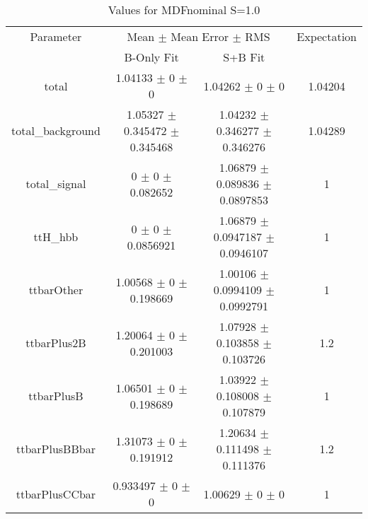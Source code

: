 \begin{table}
\centering
\caption{Values for MDFnominal S=1.0}
\begin{tabular}{cccc}
\toprule
Parameter & \multicolumn{2}{c}{Mean $\pm$ Mean Error $\pm$ RMS} & Expectation\\
 & B-Only Fit & S+B Fit & \\
\midrule
total & \num{1.04133} $\pm$ \num{0} $\pm$ \num{0} & \num{1.04262} $\pm$ \num{0} $\pm$ \num{0} & \num{1.04204}\\
total\_background & \num{1.05327} $\pm$ \num{0.345472} $\pm$ \num{0.345468} & \num{1.04232} $\pm$ \num{0.346277} $\pm$ \num{0.346276} & \num{1.04289}\\
total\_signal & \num{0} $\pm$ \num{0} $\pm$ \num{0.082652} & \num{1.06879} $\pm$ \num{0.089836} $\pm$ \num{0.0897853} & \num{1}\\
ttH\_hbb & \num{0} $\pm$ \num{0} $\pm$ \num{0.0856921} & \num{1.06879} $\pm$ \num{0.0947187} $\pm$ \num{0.0946107} & \num{1}\\
ttbarOther & \num{1.00568} $\pm$ \num{0} $\pm$ \num{0.198669} & \num{1.00106} $\pm$ \num{0.0994109} $\pm$ \num{0.0992791} & \num{1}\\
ttbarPlus2B & \num{1.20064} $\pm$ \num{0} $\pm$ \num{0.201003} & \num{1.07928} $\pm$ \num{0.103858} $\pm$ \num{0.103726} & \num{1.2}\\
ttbarPlusB & \num{1.06501} $\pm$ \num{0} $\pm$ \num{0.198689} & \num{1.03922} $\pm$ \num{0.108008} $\pm$ \num{0.107879} & \num{1}\\
ttbarPlusBBbar & \num{1.31073} $\pm$ \num{0} $\pm$ \num{0.191912} & \num{1.20634} $\pm$ \num{0.111498} $\pm$ \num{0.111376} & \num{1.2}\\
ttbarPlusCCbar & \num{0.933497} $\pm$ \num{0} $\pm$ \num{0} & \num{1.00629} $\pm$ \num{0} $\pm$ \num{0} & \num{1}\\
\bottomrule
\end{tabular}
\end{table}